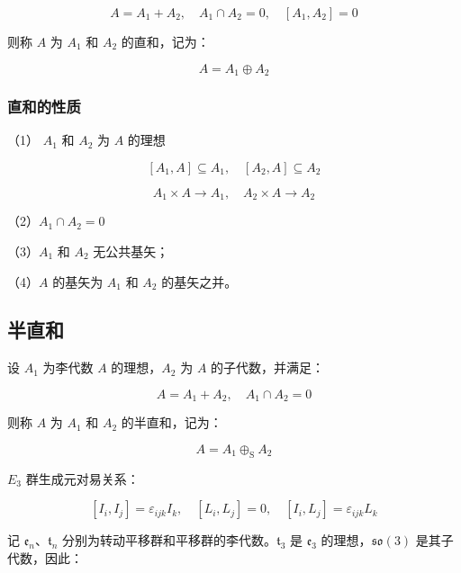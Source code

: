 \begin{equation}
A = A_1+A_2,\quad A_1\cap A_2 = 0,\quad \left[A_1,A_2 \right]=0
\end{equation}

则称 $A$ 为 $A_1$ 和 $A_2$ 的直和，记为：

\begin{equation}
A = A_1\oplus A_2
\end{equation}

\subsubsection*{直和的性质}

（1） $A_1$ 和 $A_2$ 为 $A$ 的理想

\begin{equation}
\left[A_1,A \right]\subseteq A_1,\quad
\left[A_2,A \right]\subseteq A_2
\end{equation}

\begin{equation}
A_1\times A \to A_1,\quad
A_2\times A \to A_2
\end{equation}

（2）$A_1\cap A_2=0$

（3）$A_1$ 和 $A_2$ 无公共基矢；

（4）$A$ 的基矢为 $A_1$ 和 $A_2$ 的基矢之并。

\subsection{半直和}

设 $A_1$ 为李代数 $A$ 的理想，$A_2$ 为 $A$ 的子代数，并满足：

\begin{equation}
A=A_1+A_2,\quad
A_1\cap A_2=0
\end{equation}

则称 $A$ 为 $A_1$ 和 $A_2$ 的半直和，记为：

\begin{equation}
A = A_1\oplus_{\mathrm{S}} A_2
\end{equation}

$E_3$ 群生成元对易关系：

\begin{equation}
\left[I_i,I_j \right]=\varepsilon_{ijk}I_k,\quad
\left[L_i,L_j \right]=0,\quad
\left[I_i,L_j \right]=\varepsilon_{ijk}L_k
\end{equation}

记 $\mathfrak{e}_n$、$\mathfrak{t}_n$ 分别为转动平移群和平移群的李代数。$\mathfrak{t}_3$ 是 $\mathfrak{e}_3$ 的理想，$\mathfrak{so}\left(3\right)$ 是其子代数，因此：

